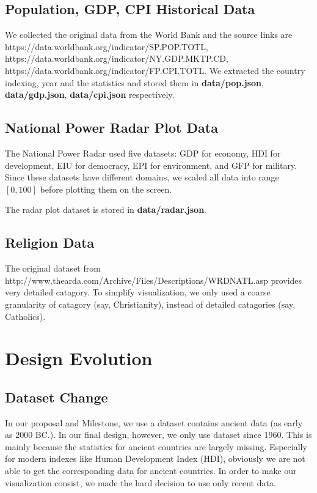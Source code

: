 \documentclass[12pt, fullpage,letterpaper]{article}
\begin{document}
\subsection{Population, GDP, CPI Historical Data}
    
    We collected the original data from the World Bank and the source links are  https://data.worldbank.org/indicator/SP.POP.TOTL, https://data.worldbank.org/indicator/NY.GDP.MKTP.CD, https://data.worldbank.org/indicator/FP.CPI.TOTL. We extracted the country indexing, year and the statistics and stored them in \textbf{data/pop.json}, \textbf{data/gdp.json}, \textbf{data/cpi.json} respectively.

\subsection{National Power Radar Plot Data}
    The National Power Radar used five datasets: GDP for economy, HDI for
    development, EIU for democracy, EPI for environment, and GFP for military.
    Since these datasets have different domains, we scaled all data into range
    $[0,100]$ before plotting them on the screen.

    The radar plot dataset is stored in \textbf{data/radar.json}.

\subsection{Religion Data}
    
    The original dataset from http://www.thearda.com/Archive/Files/Descriptions/WRDNATL.asp provides very detailed catagory. To simplify visualization,
    we only used a coarse granularity of catagory (say, Christianity), instead of detailed catagories (say, Catholics).

\section{Design Evolution}
    \subsection{Dataset Change}
        In our proposal and Milestone, we use a dataset contains ancient data (as early as 2000 BC.).
        In our final design, however, we only use dataset since 1960.
        This is mainly because the statistics for ancient countries are largely missing.
        Especially for modern indexes like Human Development Index (HDI), obviously we are not able to get the corresponding data for ancient countries.
        In order to make our visualization consist, we made the hard decision to use only recent data.
\end{document}
